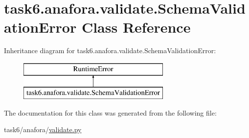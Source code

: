 \hypertarget{classtask6_1_1anafora_1_1validate_1_1SchemaValidationError}{}\section{task6.\+anafora.\+validate.\+Schema\+Validation\+Error Class Reference}
\label{classtask6_1_1anafora_1_1validate_1_1SchemaValidationError}
Inheritance diagram for task6.\+anafora.\+validate.\+Schema\+Validation\+Error\+:\begin{figure}[H]
\begin{center}
\leavevmode
\includegraphics[height=2.000000cm]{classtask6_1_1anafora_1_1validate_1_1SchemaValidationError}
\end{center}
\end{figure}


The documentation for this class was generated from the following file\+:\begin{DoxyCompactItemize}
\item 
task6/anafora/\hyperlink{validate_8py}{validate.\+py}\end{DoxyCompactItemize}
